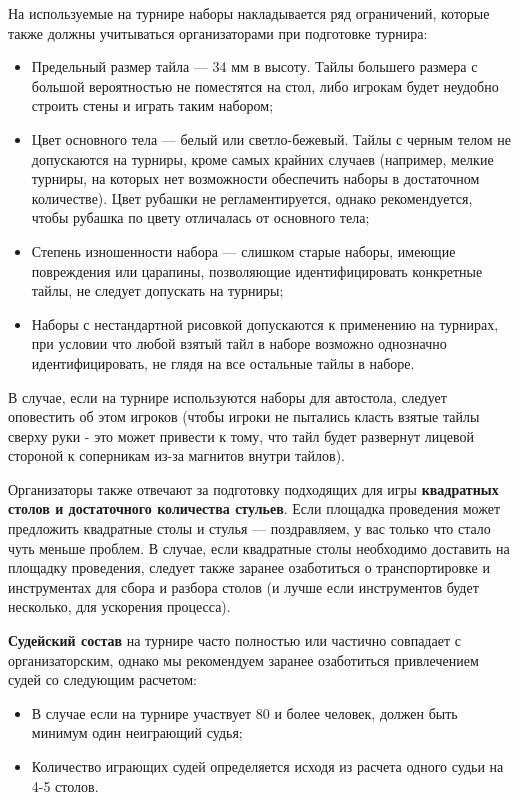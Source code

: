 На используемые на турнире наборы накладывается ряд ограничений, которые также должны учитываться организаторами при подготовке турнира:

\begin{itemize}
	\item Предельный размер тайла --- 34 мм в высоту. Тайлы большего размера с большой вероятностью не поместятся на стол, либо игрокам будет неудобно строить стены и играть таким набором;
	\item Цвет основного тела --- белый или светло-бежевый. Тайлы с черным телом не допускаются на турниры, кроме самых крайних случаев (например, мелкие турниры, на которых нет возможности обеспечить наборы в достаточном количестве). Цвет рубашки не регламентируется, однако рекомендуется, чтобы рубашка по цвету отличалась от основного тела;
	\item Степень изношенности набора --- слишком старые наборы, имеющие повреждения или царапины, позволяющие идентифицировать конкретные тайлы, не следует допускать на турниры;
	\item Наборы с нестандартной рисовкой допускаются к применению на турнирах, при условии что любой взятый тайл в наборе возможно однозначно идентифицировать, не глядя на все остальные тайлы в наборе.
\end{itemize}

В случае, если на турнире используются наборы для автостола, следует оповестить об этом игроков (чтобы игроки не пытались класть взятые тайлы сверху руки - это может привести к тому, что тайл будет развернут лицевой стороной к соперникам из-за магнитов внутри тайлов).

Организаторы также отвечают за подготовку подходящих для игры \textbf{квадратных столов и достаточного количества стульев}. Если площадка проведения может предложить квадратные столы и стулья --- поздравляем, у вас только что стало чуть меньше проблем. В случае, если квадратные столы необходимо доставить на площадку проведения, следует также заранее озаботиться о транспортировке и инструментах для сбора и разбора столов (и лучше если инструментов будет несколько, для ускорения процесса).

\textbf{Судейский состав} на турнире часто полностью или частично совпадает с организаторским, однако мы рекомендуем заранее озаботиться привлечением судей со следующим расчетом:
\begin{itemize}
	\item В случае если на турнире участвует 80 и более человек, должен быть минимум один неиграющий судья;
	\item Количество играющих судей определяется исходя из расчета одного судьи на 4-5 столов.
\end{itemize}

